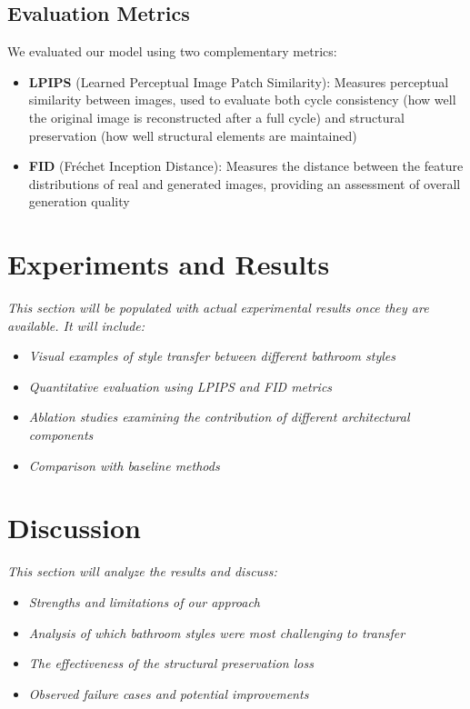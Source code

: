 \documentclass[twocolumn,superscriptaddress,aps]{revtex4-1}
\begin{document}
\subsection{Evaluation Metrics}

We evaluated our model using two complementary metrics:

\begin{itemize}
    \item \textbf{LPIPS} (Learned Perceptual Image Patch Similarity): Measures perceptual similarity between images, used to evaluate both cycle consistency (how well the original image is reconstructed after a full cycle) and structural preservation (how well structural elements are maintained)
    \item \textbf{FID} (Fréchet Inception Distance): Measures the distance between the feature distributions of real and generated images, providing an assessment of overall generation quality
\end{itemize}

\section{Experiments and Results}

\textit{This section will be populated with actual experimental results once they are available. It will include:}

\begin{itemize}
    \item \textit{Visual examples of style transfer between different bathroom styles}
    \item \textit{Quantitative evaluation using LPIPS and FID metrics}
    \item \textit{Ablation studies examining the contribution of different architectural components}
    \item \textit{Comparison with baseline methods}
\end{itemize}

\section{Discussion}

\textit{This section will analyze the results and discuss:}

\begin{itemize}
    \item \textit{Strengths and limitations of our approach}
    \item \textit{Analysis of which bathroom styles were most challenging to transfer}
    \item \textit{The effectiveness of the structural preservation loss}
    \item \textit{Observed failure cases and potential improvements}
\end{itemize}
\end{document}

